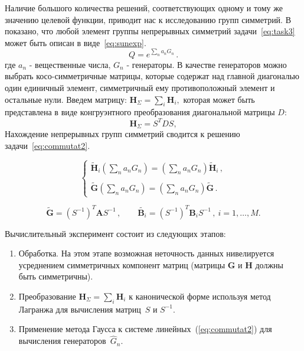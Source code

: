 Наличие большого количества решений, соответствующих одному и тому же значению целевой функции, приводит нас к исследованию групп симметрий. В~\cite{yurkov:symmetry} показано, что любой элемент группы непрерывных симметрий задачи~\ref{eq:task3} может быть описан в виде~\ref{eq:sunexp}.
\begin{equation}
\label{eq:sunexp}
Q=e^{\sum\limits_n a_n G_n} \, .
\end{equation}
где $a_n$ - вещественные числа, $G_n$ - генераторы. В качестве генераторов можно выбрать косо-симметричные матрицы, которые содержат над главной диагональю один единичный элемент, симметричный ему противоположный элемент и остальные нули.
Введем матрицу: $ {\textbf{H}}_{\Sigma} = \sum_{i} \textbf{H}_i,$ которая может быть представлена в виде конгруэнтного преобразования диагональной матрицы $D$:
$${\textbf{H}}_{\Sigma} = S^TDS,$$
Нахождение непрерывных групп симметрий сводится к решению задачи~\ref{eq:commutat2}.

\begin{equation}
\label{eq:commutat2}
\left\{
\begin{array}{l}
\displaystyle
\tilde{\textbf{H}}_i \left(\sum\limits_na_nG_n\right) =
\left(\sum\limits_na_nG_n\right)\tilde{\textbf{H}}_i \, , \\ \\
\displaystyle
\tilde{\textbf{G}} \left(\sum\limits_na_nG_n\right) = \left(\sum\limits_na_nG_n\right)\tilde{\textbf{G}} \, .
\end{array}
\right.
\end{equation}

\begin{equation}
\tilde{\textbf{G}}=\left(S^{-1}\right)^T \textbf{A} S^{-1} \, , \qquad
\tilde{\textbf{B}_i}=\left(S^{-1}\right)^T \textbf{B}_i S^{-1} \, , \ i=1,\dots,M.
\end{equation}

Вычислительный эксперимент состоит из следующих этапов:
\begin{enumerate}
  \item Обработка. На этом этапе возможная неточность данных нивелируется усреднением симметричных компонент матриц (матрицы $\textbf{G}$ и $\textbf{H}$ должны быть симметричны).
  \item %
  Преобразование $ {\textbf{H}}_{\Sigma} = \sum_{i} \textbf{H}_i$ к канонической форме используя метод Лагранжа для вычисления матриц~$S$ и $S^{-1} $.
  \item Применение метода Гаусса к системе линейных~(\ref{eq:commutat2}) для вычисления генераторов~$\hat{G}_n$.
\end{enumerate}

